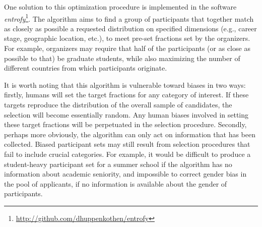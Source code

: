 One solution to this optimization procedure is implemented in the software \textit{entrofy}\footnote{\url{http://github.com/dhuppenkothen/entrofy}}. The algorithm aims to find a group of participants that together match as closely as possible a requested distribution on specified dimensions (e.g., career stage, geographic location, etc.), to meet pre-set fractions set by the organizers.
For example, organizers may require that half of the participants (or as close as possible to that) be graduate students, while also maximizing the number of different countries from which participants originate.

It is worth noting that this algorithm is vulnerable toward biases in two ways: firstly, humans will set the target fractions for any category of interest.
If these targets reproduce the distribution of the overall sample of candidates, the selection will become essentially random.
Any human biases involved in setting these target fractions will be perpetuated in the selection procedure.
Secondly, perhaps more obviously, the algorithm can only act on information that has been collected.
Biased participant sets may still result from selection procedures that fail to include crucial categories. For example, it would be difficult to produce a student-heavy participant set for a summer school if the algorithm has no information about academic seniority, and impossible to correct gender bias in the pool of applicants, if no information is available about the gender of participants.